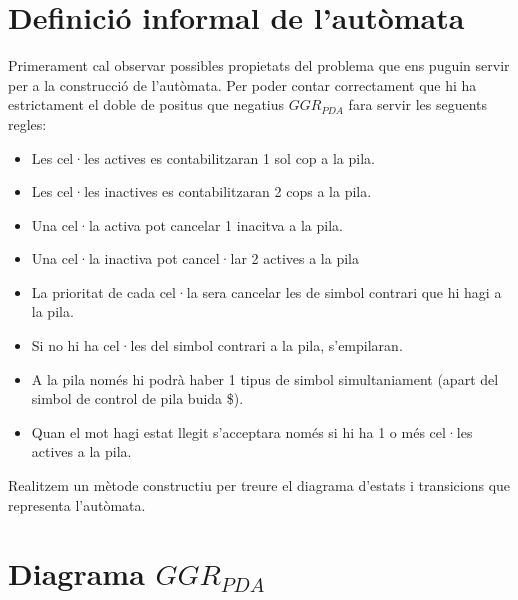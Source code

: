 \documentclass[12pt,a4paper]{report}
\def \pda{$GGR_{PDA} $}
\begin{document}
\section{Definició informal de l’autòmata}

Primerament cal observar possibles propietats del problema que ens puguin servir per a la construcció de l’autòmata. Per poder contar correctament que hi ha estrictament el doble de positus que negatius \pda{} fara servir les seguents regles:

\begin{itemize}
\item Les cel·les actives es contabilitzaran 1 sol cop a la pila.
\item Les cel·les inactives es contabilitzaran 2 cops a la pila.
\item Una cel·la activa pot cancelar 1 inacitva a la pila.
\item Una cel·la inactiva pot cancel·lar 2 actives a la pila
\item La prioritat de cada cel·la sera cancelar les de simbol contrari que hi hagi a la pila.
\item Si no hi ha cel·les del simbol contrari a la pila, s’empilaran.
\item A la pila només hi podrà haber 1 tipus de simbol simultaniament (apart del simbol de control de pila buida \$).
\item Quan el mot hagi estat llegit s’acceptara només si hi ha 1 o més cel·les actives a la pila.
\end{itemize}

Realitzem un mètode constructiu per treure el diagrama d’estats i transicions que representa l’autòmata.

\section{Diagrama \pda{}}
\end{document}
